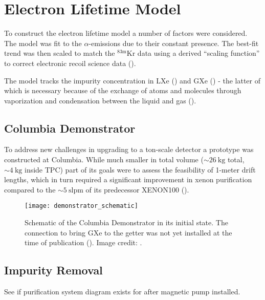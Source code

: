 \section{Electron Lifetime Model}
\label{sec:electron_lifetime_model}
To construct the electron lifetime model a number of factors were considered.  The model was fit to the  $\alpha$-emissions
due to their constant presence.  The best-fit trend was then scaled to match the $\mathrm{^{83m}Kr}$ data using a derived
``scaling function'' to correct electronic recoil science data ().

The model tracks the impurity concentration in LXe (\il) and GXe (\ig) - the latter of which is necessary because of the
exchange of atoms and molecules through vaporization and condensation between the liquid and gas
().



\subsection{Columbia Demonstrator}
\label{subsec:electron_lifetime_model_demonstrator}
To address new challenges in upgrading to a ton-scale detector a prototype was constructed at Columbia.  While much smaller in total
volume (${\sim}26\ \mathrm{kg}$ total, ${\sim}4\ \mathrm{kg}$ inside TPC) part of its goals were to assess the feasibility of 1-meter
drift lengths, which in turn required a significant improvement in xenon purification compared to the ${\sim}5\ \mathrm{slpm}$ of its
predecessor XENON100 ().

\begin{figure}
\centering
\texttt{[image: demonstrator\_schematic]}
\caption{Schematic of the Columbia Demonstrator in its initial state.  The connection to bring GXe to the getter was not yet installed
at the time of publication ().  Image credit: .}
\label{fig:electron_lifetime_model_demonstrator_schematic}
\end{figure}



\subsection{Impurity Removal}
\label{subsec:electron_lifetime_model_removal}
See if purification system diagram exists for after magnetic pump installed.

